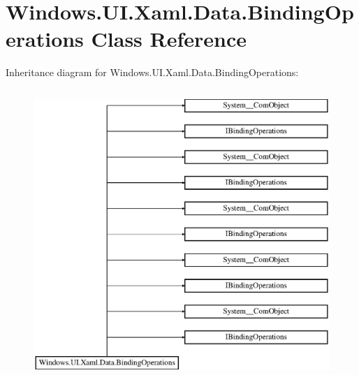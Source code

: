 \hypertarget{class_windows_1_1_u_i_1_1_xaml_1_1_data_1_1_binding_operations}{}\section{Windows.\+U\+I.\+Xaml.\+Data.\+Binding\+Operations Class Reference}
\label{class_windows_1_1_u_i_1_1_xaml_1_1_data_1_1_binding_operations}
Inheritance diagram for Windows.\+U\+I.\+Xaml.\+Data.\+Binding\+Operations\+:\begin{figure}[H]
\begin{center}
\leavevmode
\includegraphics[height=11.000000cm]{class_windows_1_1_u_i_1_1_xaml_1_1_data_1_1_binding_operations}
\end{center}
\end{figure}
